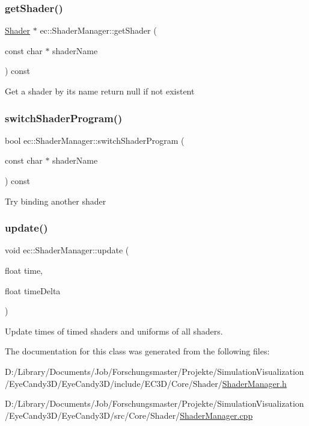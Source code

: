 \subsubsection{\texorpdfstring{get\+Shader()}{getShader()}}
{\footnotesize\ttfamily \mbox{\hyperlink{classec_1_1_shader}{Shader}} $\ast$ ec\+::\+Shader\+Manager\+::get\+Shader (\begin{DoxyParamCaption}\item[{const char $\ast$}]{shader\+Name }\end{DoxyParamCaption}) const}

Get a shader by its name return null if not existent \mbox{\label{classec_1_1_shader_manager_af42171dd2256a130b056d772e3190da0}} 
\subsubsection{\texorpdfstring{switch\+Shader\+Program()}{switchShaderProgram()}}
{\footnotesize\ttfamily bool ec\+::\+Shader\+Manager\+::switch\+Shader\+Program (\begin{DoxyParamCaption}\item[{const char $\ast$}]{shader\+Name }\end{DoxyParamCaption}) const}

Try binding another shader \mbox{\label{classec_1_1_shader_manager_ac5dc847819a1e8d154d8fd0280e488c1}} 
\subsubsection{\texorpdfstring{update()}{update()}}
{\footnotesize\ttfamily void ec\+::\+Shader\+Manager\+::update (\begin{DoxyParamCaption}\item[{float}]{time,  }\item[{float}]{time\+Delta }\end{DoxyParamCaption})}

Update times of timed shaders and uniforms of all shaders. 

The documentation for this class was generated from the following files\+:\begin{DoxyCompactItemize}
\item 
D\+:/\+Library/\+Documents/\+Job/\+Forschungsmaster/\+Projekte/\+Simulation\+Visualization/\+Eye\+Candy3\+D/\+Eye\+Candy3\+D/include/\+E\+C3\+D/\+Core/\+Shader/\mbox{\hyperlink{_shader_manager_8h}{Shader\+Manager.\+h}}\item 
D\+:/\+Library/\+Documents/\+Job/\+Forschungsmaster/\+Projekte/\+Simulation\+Visualization/\+Eye\+Candy3\+D/\+Eye\+Candy3\+D/src/\+Core/\+Shader/\mbox{\hyperlink{_shader_manager_8cpp}{Shader\+Manager.\+cpp}}\end{DoxyCompactItemize}
